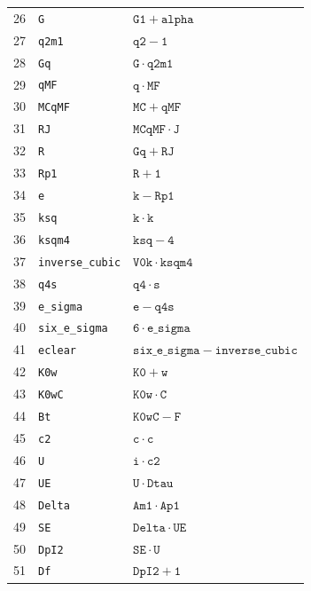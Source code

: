 \documentclass[11pt]{article}
\theoremstyle{remark}
\begin{document}
\begin{longtable}{rll}
26 & \texttt{G} & $\mathtt{G1} + \mathtt{alpha}$ \\
27 & \texttt{q2m1} & $\mathtt{q2} - \mathtt{1}$ \\
28 & \texttt{Gq} & $\mathtt{G} \mathbin{\cdot} \mathtt{q2m1}$ \\
29 & \texttt{qMF} & $\mathtt{q} \mathbin{\cdot} \mathtt{MF}$ \\
30 & \texttt{MCqMF} & $\mathtt{MC} + \mathtt{qMF}$ \\
31 & \texttt{RJ} & $\mathtt{MCqMF} \mathbin{\cdot} \mathtt{J}$ \\
32 & \texttt{R} & $\mathtt{Gq} + \mathtt{RJ}$ \\
33 & \texttt{Rp1} & $\mathtt{R} + \mathtt{1}$ \\
34 & \texttt{e} & $\mathtt{k} - \mathtt{Rp1}$ \\
35 & \texttt{ksq} & $\mathtt{k} \mathbin{\cdot} \mathtt{k}$ \\
36 & \texttt{ksqm4} & $\mathtt{ksq} - \mathtt{4}$ \\
37 & \texttt{inverse\_cubic} & $\mathtt{V0k} \mathbin{\cdot} \mathtt{ksqm4}$ \\
38 & \texttt{q4s} & $\mathtt{q4} \mathbin{\cdot} \mathtt{s}$ \\
39 & \texttt{e\_sigma} & $\mathtt{e} - \mathtt{q4s}$ \\
40 & \texttt{six\_e\_sigma} & $\mathtt{6} \mathbin{\cdot} \mathtt{e\_sigma}$ \\
41 & \texttt{eclear} & $\mathtt{six\_e\_sigma} - \mathtt{inverse\_cubic}$ \\
42 & \texttt{K0w} & $\mathtt{K0} + \mathtt{w}$ \\
43 & \texttt{K0wC} & $\mathtt{K0w} \mathbin{\cdot} \mathtt{C}$ \\
44 & \texttt{Bt} & $\mathtt{K0wC} - \mathtt{F}$ \\
45 & \texttt{c2} & $\mathtt{c} \mathbin{\cdot} \mathtt{c}$ \\
46 & \texttt{U} & $\mathtt{i} \mathbin{\cdot} \mathtt{c2}$ \\
47 & \texttt{UE} & $\mathtt{U} \mathbin{\cdot} \mathtt{Dtau}$ \\
48 & \texttt{Delta} & $\mathtt{Am1} \mathbin{\cdot} \mathtt{Ap1}$ \\
49 & \texttt{SE} & $\mathtt{Delta} \mathbin{\cdot} \mathtt{UE}$ \\
50 & \texttt{DpI2} & $\mathtt{SE} \mathbin{\cdot} \mathtt{U}$ \\
51 & \texttt{Df} & $\mathtt{DpI2} + \mathtt{1}$ \\

\end{longtable}
\end{document}

